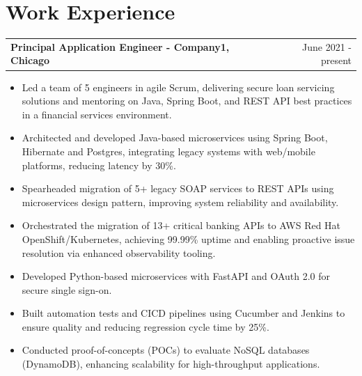\documentclass[a4paper,12pt]{article}
\makeatletter
\newenvironment{joblong}[2]
    {
    \begin{tabularx}{\linewidth}{@{}l X r@{}}
    \textbf{#1} & \hfill &  #2 \\[3.75pt]
    \end{tabularx}
    \begin{minipage}[t]{\linewidth}
    \begin{itemize}[nosep,after=\strut, leftmargin=1em, itemsep=3pt,label=--]
    }
    {
    \end{itemize}
    \end{minipage}    
    }
\makeatother
\begin{document}
\section{Work Experience}

\begin{joblong}{Principal Application Engineer - Company1, Chicago}{June 2021 - present}
\item Led a team of 5 engineers in agile Scrum, delivering secure loan servicing solutions and mentoring on Java, Spring Boot, and REST API best practices in a financial services environment.
\item Architected and developed Java-based microservices using Spring Boot, Hibernate and Postgres, integrating legacy systems with web/mobile platforms, reducing latency by 30\%.
\item Spearheaded migration of 5+ legacy SOAP services to REST APIs using microservices design pattern, improving system reliability and availability.
\item Orchestrated the migration of 13+ critical banking APIs to AWS Red Hat OpenShift/Kubernetes, achieving 99.99\% uptime and enabling proactive issue resolution via enhanced observability tooling.
\item Developed Python-based microservices with FastAPI and OAuth 2.0 for secure single sign-on.
\item Built automation tests and CICD pipelines using Cucumber and Jenkins to ensure quality and reducing regression cycle time by 25\%.
\item Conducted proof-of-concepts (POCs) to evaluate NoSQL databases (DynamoDB), enhancing scalability for high-throughput applications.
\end{joblong}
\end{document}
